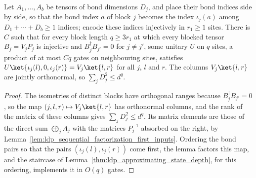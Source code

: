 \begin{lemma}
    \label{thm:ldp_block_sum_unitary}
    \leanok
    Let $A_1,\dots,A_b$ be tensors of bond dimensions $D_j$, and place their bond
    indices side by side, so that the bond index $a$ of block $j$ becomes the
    index $\iota_j(a)$ among $D_1+\cdots+D_b\geq1$ indices; encode these
    indices injectively in $r_1\geq1$ sites. There is $C$ such that for every
    block length $q\geq3r_1$ at which every blocked tensor $B_j=V_jP_j$ is
    injective and $B_j^\dagger B_{j'}=0$ for $j\neq j'$, some unitary $U$ on $q$
    sites, a product of at most $Cq$ gates on neighbouring sites, satisfies
    $U\ket{\iota_j(l),0,\iota_j(r)}=V_j\ket{l,r}$ for all $j$, $l$ and $r$. The
    columns $V_j\ket{l,r}$ are jointly orthonormal, so
    $\sum_jD_j^2\leq d^q$.
\end{lemma}
\begin{proof}
    \leanok
    The isometries of distinct blocks have orthogonal ranges because
    $B_j^\dagger B_{j'}=0$, so the map $(j,l,r)\mapsto V_j\ket{l,r}$ has
    orthonormal columns, and the rank of the matrix of these columns gives
    $\sum_jD_j^2\leq d^q$. Its matrix elements are those of the direct sum
    $\bigoplus_jA_j$ with the matrices $P_j^{-1}$ absorbed on the right, by
    Lemma~\ref{lem:ldp_sequential_factorization_first_inputs}. Ordering the
    bond pairs so that the pairs $(\iota_j(l),\iota_j(r))$ come first, the
    lemma factors this map, and the staircase of
    Lemma~\ref{thm:ldp_approximating_state_depth}, for this ordering, implements
    it in $O(q)$ gates.
\end{proof}

